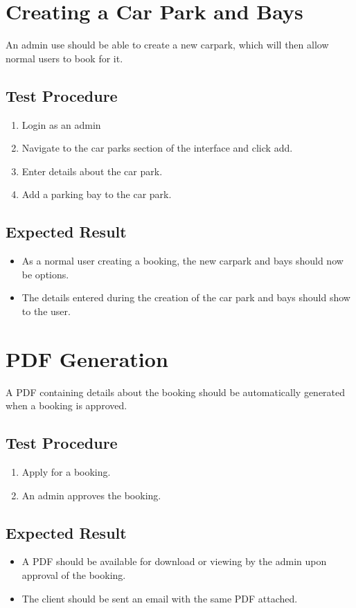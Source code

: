 \documentclass[a4paper, draft]{article}
\begin{document}
\newpage
\section{Creating a Car Park and Bays}
An admin use should be able to create a new carpark, which will then allow normal users to book for it.

\subsection{Test Procedure}
\begin{enumerate}
    \item Login as an admin
    \item Navigate to the car parks section of the interface and click add.
    \item Enter details about the car park.
    \item Add a parking bay to the car park.
\end{enumerate}

\subsection{Expected Result}
\begin{itemize}
    \item As a normal user creating a booking, the new carpark and bays should now be options.
    \item The details entered during the creation of the car park and bays should show to the user.
\end{itemize}

\newpage
\section{PDF Generation} \label{pdf}
A PDF containing details about the booking should be automatically generated when a booking is approved.

\subsection{Test Procedure}
\begin{enumerate}
    \item Apply for a booking.
    \item An admin approves the booking.
\end{enumerate}

\subsection{Expected Result}
\begin{itemize}
    \item A PDF should be available for download or viewing by the admin upon approval of the booking.
    \item The client should be sent an email with the same PDF attached.
\end{itemize}
\end{document}
